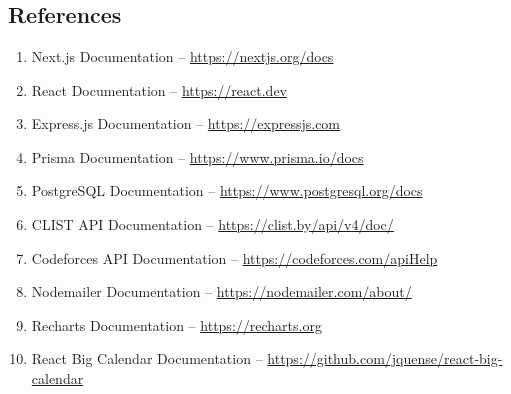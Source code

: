 \documentclass[12pt,a4paper]{report}
\begin{document}
\chapter{}
\begin{normalsize}
\setlength{\baselineskip}{1.3\baselineskip}

\section{References}

\begin{enumerate}
    \item Next.js Documentation -- \url{https://nextjs.org/docs}
    \item React Documentation -- \url{https://react.dev}
    \item Express.js Documentation -- \url{https://expressjs.com}
    \item Prisma Documentation -- \url{https://www.prisma.io/docs}
    \item PostgreSQL Documentation -- \url{https://www.postgresql.org/docs}
    \item CLIST API Documentation -- \url{https://clist.by/api/v4/doc/}
    \item Codeforces API Documentation -- \url{https://codeforces.com/apiHelp}
    \item Nodemailer Documentation -- \url{https://nodemailer.com/about/}
    \item Recharts Documentation -- \url{https://recharts.org}
    \item React Big Calendar Documentation -- \url{https://github.com/jquense/react-big-calendar}
\end{enumerate}

\end{normalsize}
\end{document}

